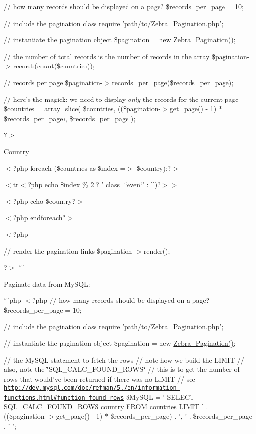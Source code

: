 // how many records should be displayed on a page? \$records\-\_\-per\-\_\-page = 10;

// include the pagination class require 'path/to/\-Zebra\-\_\-\-Pagination.\-php';

// instantiate the pagination object \$pagination = new \hyperlink{class_zebra___pagination}{Zebra\-\_\-\-Pagination()};

// the number of total records is the number of records in the array \$pagination-\/$>$records(count(\$countries));

// records per page \$pagination-\/$>$records\-\_\-per\-\_\-page(\$records\-\_\-per\-\_\-page);

// here's the magick\-: we need to display {\itshape only} the records for the current page \$countries = array\-\_\-slice( \$countries, ((\$pagination-\/$>$get\-\_\-page() -\/ 1) $\ast$ \$records\-\_\-per\-\_\-page), \$records\-\_\-per\-\_\-page );

?$>$

\begin{TabularC}{0}
\hline
\end{TabularC}


Country

$<$?php foreach (\$countries as \$index =$>$ \$country)\-:?$>$

$<$tr$<$?php echo \$index \% 2 ? ' class=\char`\"{}even\char`\"{}' \-: '')?$>$$>$ 

$<$?php echo \$country?$>$ 

$<$?php endforeach?$>$ 

$<$?php

// render the pagination links \$pagination-\/$>$render();

?$>$ ```

Paginate data from My\-S\-Q\-L\-:

```php $<$?php // how many records should be displayed on a page? \$records\-\_\-per\-\_\-page = 10;

// include the pagination class require 'path/to/\-Zebra\-\_\-\-Pagination.\-php';

// instantiate the pagination object \$pagination = new \hyperlink{class_zebra___pagination}{Zebra\-\_\-\-Pagination()};

// the My\-S\-Q\-L statement to fetch the rows // note how we build the L\-I\-M\-I\-T // also, note the \char`\"{}\-S\-Q\-L\-\_\-\-C\-A\-L\-C\-\_\-\-F\-O\-U\-N\-D\-\_\-\-R\-O\-W\-S\char`\"{} // this is to get the number of rows that would've been returned if there was no L\-I\-M\-I\-T // see \href{http://dev.mysql.com/doc/refman/5.0/en/information-functions.html#function_found-rows}{\tt http\-://dev.\-mysql.\-com/doc/refman/5./en/information-\/functions.\-html\#function\-\_\-found-\/rows} \$\-My\-S\-Q\-L = ' S\-E\-L\-E\-C\-T S\-Q\-L\-\_\-\-C\-A\-L\-C\-\_\-\-F\-O\-U\-N\-D\-\_\-\-R\-O\-W\-S country F\-R\-O\-M countries L\-I\-M\-I\-T ' . ((\$pagination-\/$>$get\-\_\-page() -\/ 1) $\ast$ \$records\-\_\-per\-\_\-page) . ', ' . \$records\-\_\-per\-\_\-page . ' ';

